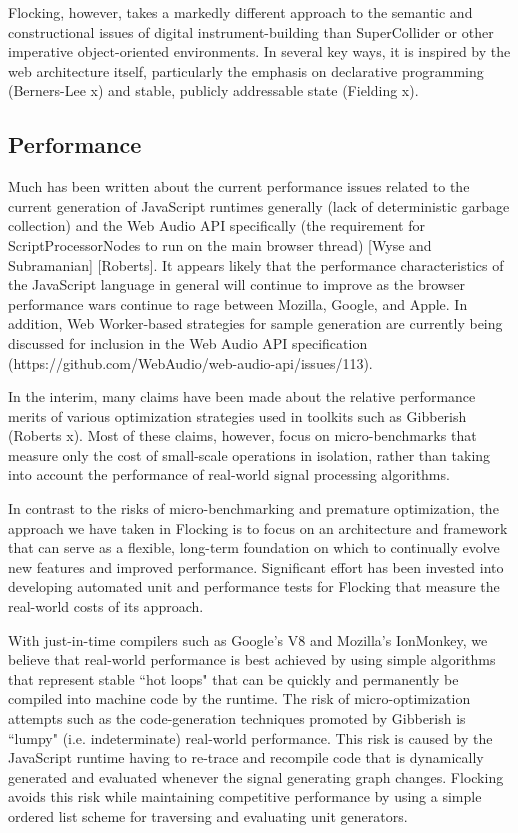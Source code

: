 \documentclass{article}
\begin{document}
Flocking, however, takes a markedly different approach to the semantic and constructional issues of digital instrument-building than SuperCollider or other imperative object-oriented environments. In several key ways, it is inspired by the web architecture itself, particularly the emphasis on declarative programming (Berners-Lee x) and stable, publicly addressable state (Fielding x).

\subsection{Performance}

Much has been written about the current performance issues related to the current generation of JavaScript runtimes generally (lack of deterministic garbage collection) and the Web Audio API specifically (the requirement for ScriptProcessorNodes to run on the main browser thread) [Wyse and Subramanian] [Roberts]. It appears likely that the performance characteristics of the JavaScript language in general will continue to improve as the browser performance wars continue to rage between Mozilla, Google, and Apple. In addition, Web Worker-based strategies for sample generation are currently being discussed for inclusion in the Web Audio API specification (https://github.com/WebAudio/web-audio-api/issues/113).

In the interim, many claims have been made about the relative performance merits of various optimization strategies used in toolkits such as Gibberish (Roberts x). Most of these claims, however, focus on micro-benchmarks that measure only the cost of small-scale operations in isolation, rather than taking into account the performance of real-world signal processing algorithms.

In contrast to the risks of micro-benchmarking and premature optimization, the approach we have taken in Flocking is to focus on an architecture and framework that can serve as a flexible, long-term foundation on which to continually evolve new features and improved performance. Significant effort has been invested into developing automated unit and performance tests for Flocking that measure the real-world costs of its approach.

With just-in-time compilers such as Google's V8 and Mozilla's IonMonkey, we believe that real-world performance is best achieved by using simple algorithms that represent stable ``hot loops" that can be quickly and permanently be compiled into machine code by the runtime. The risk of micro-optimization attempts such as the code-generation techniques promoted by Gibberish is ``lumpy" (i.e. indeterminate) real-world performance. This risk is caused by the JavaScript runtime having to re-trace and recompile code that is dynamically generated and evaluated whenever the signal generating graph changes. Flocking avoids this risk while maintaining competitive performance by using a simple ordered list scheme for traversing and evaluating unit generators.
\end{document}

